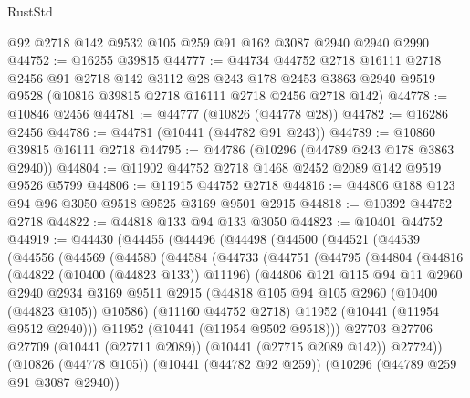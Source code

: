 \begin{lexlean}{RustStd}
\begin{coremodule}
    @92
    @2718
    @142
    @9532
    @105
    @259
    @91
    @162
    @3087
    @2940
    @2940
    @2990
@44752 := @16255 @39815
@44777 := @44734
    @44752
    @2718
    @16111
    @2718
    @2456
    @91
    @2718
    @142
    @3112
    @28
    @243
    @178
    @2453
    @3863
    @2940
    @9519
    @9528
    (@10816 @39815 @2718 @16111 @2718 @2456 @2718 @142)
@44778 := @10846 @2456
@44781 := @44777 (@10826 (@44778 @28))
@44782 := @16286 @2456
@44786 := @44781 (@10441 (@44782 @91 @243))
@44789 := @10860 @39815 @16111 @2718
@44795 := @44786 (@10296 (@44789 @243 @178 @3863 @2940))
@44804 := @11902 @44752 @2718 @1468 @2452 @2089 @142 @9519 @9526 @5799
@44806 := @11915 @44752 @2718
@44816 := @44806 @188 @123 @94 @96 @3050 @9518 @9525 @3169 @9501 @2915
@44818 := @10392 @44752 @2718
@44822 := @44818 @133 @94 @133 @3050
@44823 := @10401 @44752
@44919 := @44430
    (@44455
      (@44496
        (@44498
          (@44500
            (@44521
              (@44539
                (@44556
                  (@44569
                    (@44580
                      (@44584
                        (@44733
                          (@44751
                            (@44795
                              (@44804
                                (@44816
                                  (@44822 (@10400 (@44823 @133)) @11196)
                                  (@44806
                                    @121
                                    @115
                                    @94
                                    @11
                                    @2960
                                    @2940
                                    @2934
                                    @3169
                                    @9511
                                    @2915
                                    (@44818 @105 @94 @105 @2960 (@10400 (@44823 @105)) @10586)
                                    (@11160 @44752 @2718)
                                    @11952
                                    (@10441 (@11954 @9512 @2940)))
                                  @11952
                                  (@10441 (@11954 @9502 @9518)))
                                @27703
                                @27706
                                @27709
                                (@10441 (@27711 @2089))
                                (@10441 (@27715 @2089 @142))
                                @27724))
                            (@10826 (@44778 @105))
                            (@10441 (@44782 @92 @259))
                            (@10296 (@44789 @259 @91 @3087 @2940))

\end{coremodule}
\end{lexlean}

